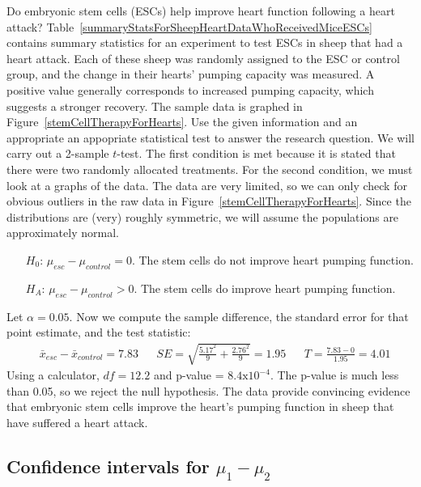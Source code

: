 \begin{example} {\label{exerciseToEvaluteWhetherESCsAreHelpfulInImprovingHeartFunctionInSheep}
Do embryonic stem cells (ESCs) help improve heart function following a heart attack? Table~\ref{summaryStatsForSheepHeartDataWhoReceivedMiceESCs} contains summary statistics for an experiment to test ESCs in sheep that had a heart attack. Each of these sheep was randomly assigned to the ESC or control group, and the change in their hearts' pumping capacity was measured. A positive value generally corresponds to increased pumping capacity, which suggests a stronger recovery. The sample data is graphed in Figure~\ref{stemCellTherapyForHearts}. Use the given information and an appropriate an appopriate statistical test to answer the research question.
}
We will carry out a 2-sample $t$-test. The first condition is met because it is stated that there were two randomly allocated treatments. For the second condition, we must look at a graphs of the data. The data are very limited, so we can only check for obvious outliers in the raw data in Figure~\ref{stemCellTherapyForHearts}. Since the distributions are (very) roughly symmetric, we will assume the populations are approximately normal.
\begin{itemize}
\setlength{\itemsep}{0mm}
\item[$H_0$:] $\mu_{esc} - \mu_{control} = 0$. The stem cells do not improve heart pumping function.
\item[$H_A$:] $\mu_{esc} - \mu_{control} > 0$. The stem cells do improve heart pumping function.
\end{itemize}
Let $\alpha=0.05$. Now we compute the sample difference, the standard error for that point estimate, and the test statistic:
\begin{align*}
& \bar{x}_{esc} - \bar{x}_{control} = 7.83
&& SE = \sqrt{\frac{5.17^2}{9} + \frac{2.76^2}{9}} = 1.95
&&T = \frac{7.83 - 0}{1.95} = 4.01
\end{align*}
Using a calculator, $df=12.2$ and p-value = $8.4\text{x}10^{-4}$. The p-value is much less than 0.05, so we reject the null hypothesis. The data provide convincing evidence that embryonic stem cells improve the heart's pumping function in sheep that have suffered a heart attack.
\end{example}


\subsection{Confidence intervals for $\mu_1-\mu_2$}

